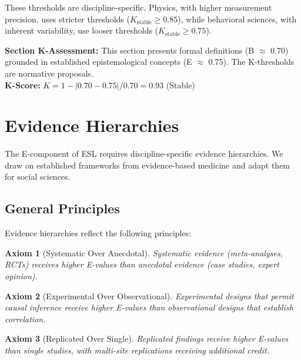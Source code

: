 \documentclass[11pt,a4paper]{article}
\newtheorem{axiom}{Axiom}
\begin{document}
These thresholds are discipline-specific. Physics, with higher measurement
precision, uses stricter thresholds ($K_{\text{stable}} \geq 0.85$), while
behavioral sciences, with inherent variability, use looser thresholds
($K_{\text{stable}} \geq 0.75$).

\begin{eslbox}
\textbf{Section K-Assessment:} This section presents formal definitions
(B $\approx$ 0.70) grounded in established epistemological concepts
(E $\approx$ 0.75). The K-thresholds are normative proposals. \\
\textbf{K-Score:} $K = 1 - |0.70 - 0.75| / 0.70 = 0.93$ (Stable)
\end{eslbox}

\section{Evidence Hierarchies}

The E-component of ESL requires discipline-specific evidence hierarchies.
We draw on established frameworks from evidence-based medicine
\citep{GRADE2004, OxfordCEBM2011} and adapt them for social sciences.

\subsection{General Principles}

Evidence hierarchies reflect the following principles:

\begin{axiom}[Systematic Over Anecdotal]
Systematic evidence (meta-analyses, RCTs) receives higher E-values than
anecdotal evidence (case studies, expert opinion).
\end{axiom}

\begin{axiom}[Experimental Over Observational]
Experimental designs that permit causal inference receive higher E-values
than observational designs that establish correlation.
\end{axiom}

\begin{axiom}[Replicated Over Single]
Replicated findings receive higher E-values than single studies, with
multi-site replications receiving additional credit.
\end{axiom}
\end{document}
